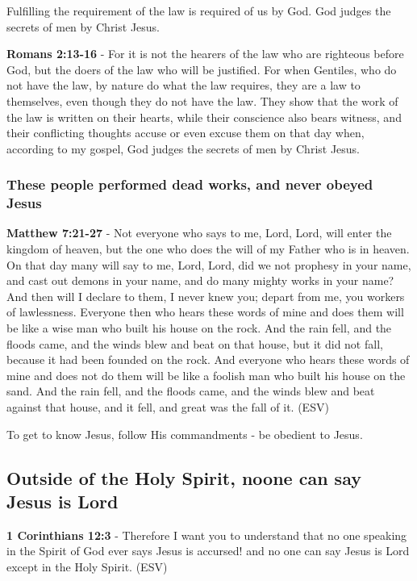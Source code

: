 \documentclass[11pt]{article}
\begin{document}
Fulfilling the requirement of the law is required of us by God. God judges the secrets of men by Christ Jesus.

\textbf{Romans 2:13-16} - For it is not the hearers of the law who are righteous before God, but the doers of the law who will be justified.  For when Gentiles, who do not have the law, by nature do what the law requires, they are a law to themselves, even though they do not have the law.  They show that the work of the law is written on their hearts, while their conscience also bears witness, and their conflicting thoughts accuse or even excuse them on that day when, according to my gospel, God judges the secrets of men by Christ Jesus.

\subsubsection{These people performed dead works, and never obeyed Jesus}
\label{sec:org375d2b2}

\textbf{Matthew 7:21-27} - Not everyone who says to me, Lord, Lord, will enter the kingdom of heaven, but the one who does the will of my Father who is in heaven.  On that day many will say to me, Lord, Lord, did we not prophesy in your name, and cast out demons in your name, and do many mighty works in your name?  And then will I declare to them, I never knew you; depart from me, you workers of lawlessness.  Everyone then who hears these words of mine and does them will be like a wise man who built his house on the rock.  And the rain fell, and the floods came, and the winds blew and beat on that house, but it did not fall, because it had been founded on the rock.  And everyone who hears these words of mine and does not do them will be like a foolish man who built his house on the sand.  And the rain fell, and the floods came, and the winds blew and beat against that house, and it fell, and great was the fall of it. (ESV)

To get to know Jesus, follow His commandments - be obedient to Jesus.

\subsection{Outside of the Holy Spirit, noone can say Jesus is Lord}
\label{sec:org45f01b7}

\textbf{1 Corinthians 12:3} - Therefore I want you to understand that no one speaking in the Spirit of God ever says Jesus is accursed! and no one can say Jesus is Lord except in the Holy Spirit. (ESV)
\end{document}
